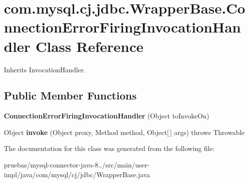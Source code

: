 \hypertarget{classcom_1_1mysql_1_1cj_1_1jdbc_1_1_wrapper_base_1_1_connection_error_firing_invocation_handler}{}\section{com.\+mysql.\+cj.\+jdbc.\+Wrapper\+Base.\+Connection\+Error\+Firing\+Invocation\+Handler Class Reference}
\label{classcom_1_1mysql_1_1cj_1_1jdbc_1_1_wrapper_base_1_1_connection_error_firing_invocation_handler}


Inherits Invocation\+Handler.

\subsection*{Public Member Functions}
\begin{DoxyCompactItemize}
\item 
\mbox{\label{classcom_1_1mysql_1_1cj_1_1jdbc_1_1_wrapper_base_1_1_connection_error_firing_invocation_handler_a62d12a26671751ab1c451c8350912337}} 
{\bfseries Connection\+Error\+Firing\+Invocation\+Handler} (Object to\+Invoke\+On)
\item 
\mbox{\label{classcom_1_1mysql_1_1cj_1_1jdbc_1_1_wrapper_base_1_1_connection_error_firing_invocation_handler_a227a5a682614df2dc9e4587f89e1c9a8}} 
Object {\bfseries invoke} (Object proxy, Method method, Object\mbox{[}$\,$\mbox{]} args)  throws Throwable 
\end{DoxyCompactItemize}


The documentation for this class was generated from the following file\+:\begin{DoxyCompactItemize}
\item 
pruebas/mysql-\/connector-\/java-\/8../src/main/user-\/impl/java/com/mysql/cj/jdbc/Wrapper\+Base.\+java\end{DoxyCompactItemize}
